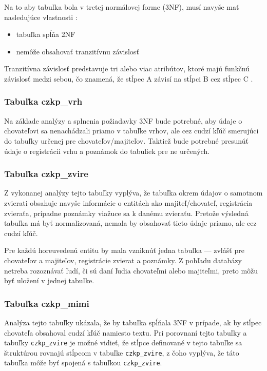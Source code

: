 Na to aby tabuľka bola v tretej normálovej forme (3NF), musí navyše mať nasledujúce vlastnosti \cite{typy-normalizacie}:
\begin{itemize}
	\item tabuľka spĺňa 2NF
	\item nemôže obsahovať tranzitívnu závislosť
\end{itemize}

Tranzitívna závislosť predstavuje tri alebo viac atribútov, ktoré majú funkčnú závislosť medzi sebou, čo znamená, že stĺpec A závisí na stĺpci B cez stĺpec C \cite{tranzitivna-zavislost}.

\subsubsection*{Tabuľka czkp\_vrh}
Na základe analýzy a splnenia požiadavky 3NF bude potrebné, aby údaje o chovateľovi sa nenachádzali priamo v tabuľke vrhov, ale cez cudzí kľúč smerujúci do tabuľky určenej pre chovateľov/majiteľov.
Taktiež bude potrebné presunúť údaje o registrácii vrhu a poznámok do tabuliek pre ne určených.

\subsubsection*{Tabuľka czkp\_zvire}
Z vykonanej analýzy tejto tabuľky vyplýva, že tabuľka okrem údajov o samotnom zvierati obsahuje navyše informácie o entitách ako majiteľ/chovateľ, registrácia zvieraťa, prípadne poznámky viažuce sa k danému zvieraťu. Pretože výsledná tabuľka má byť normalizovaná, nemala by obsahovať tieto údaje priamo, ale cez cudzí kľúč.

Pre každú horeuvedenú entitu by mala vzniknúť jedna tabuľka --- zvlášť pre chovateľov a majiteľov, registrácie zvierat a poznámky. Z pohľadu databázy netreba rozoznávať ľudí, či sú daní ľudia chovateľmi alebo majiteľmi, preto môžu byť uložení v jednej tabuľke.

\subsubsection*{Tabuľka czkp\_mimi}
Analýza tejto tabuľky ukázala, že by tabuľka spĺňala 3NF v prípade, ak by stĺpec chovateľa obsahoval cudzí kľúč namiesto textu.
Pri porovnaní tejto tabuľky a tabuľky \texttt{czkp_zvire} je možné vidieť, že stĺpce definované v tejto tabuľke sa štruktúrou rovnajú stĺpcom v tabuľke \texttt{czkp_zvire}, z čoho vyplýva, že táto tabuľka môže byť spojená s tabuľkou \texttt{czkp_zvire}.

